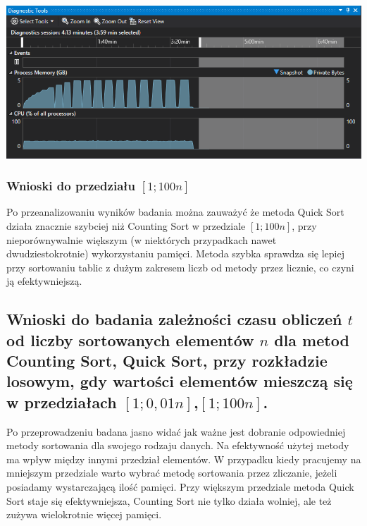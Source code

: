 \documentclass[polish,polish,a4paper]{article}
\begin{document}
\begin{spacing}{1.5}
\begin{minipage}[H]{\textwidth}
	\begin{center}
		\includegraphics[scale=0.85]{zad4pamiec100n.png}
		\label{fig:zad4pamiec100n}
	\end{center}
\end{minipage}



\subsubsection{Wnioski do przedziału $[1;100n]$}

Po przeanalizowaniu wyników badania można zauważyć że metoda Quick Sort działa znacznie szybciej niż Counting Sort w przedziale $[1;100n]$, przy nieporównywalnie większym (w niektórych przypadkach nawet dwudziestokrotnie) wykorzystaniu pamięci. Metoda szybka sprawdza się lepiej przy sortowaniu tablic z dużym zakresem liczb od metody przez licznie, co czyni ją efektywniejszą.


\subsection{Wnioski do badania zależności czasu obliczeń $t$ od liczby sortowanych elementów $n$ dla metod Counting Sort, Quick Sort, przy rozkładzie losowym, gdy wartości elementów mieszczą się w przedziałach  $ [1;0,01n] $,$ [1;100n] $. }

Po przeprowadzeniu badana jasno widać jak ważne jest dobranie odpowiedniej metody sortowania dla swojego rodzaju danych. Na efektywność użytej metody ma wpływ między innymi przedział elementów. W przypadku kiedy pracujemy na mniejszym przedziale warto wybrać metodę sortowania przez zliczanie, jeżeli posiadamy wystarczającą ilość pamięci. Przy większym przedziale metoda Quick Sort staje się efektywniejsza, Counting Sort nie tylko działa wolniej, ale też zużywa wielokrotnie więcej pamięci.
	

	
\end{spacing}
	\newpage
	\tableofcontents
\end{document}

